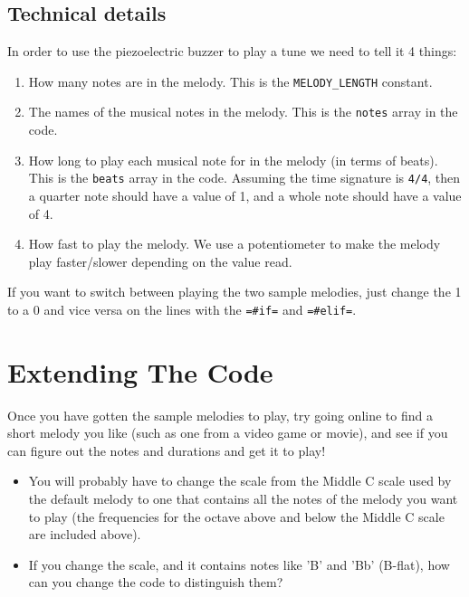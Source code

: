 \documentclass[11pt]{article}
\begin{document}
\subsection{Technical details}
\label{sec-5-1}

In order to use the piezoelectric buzzer to play a tune we need to tell it 4 things:

\begin{enumerate}
\item How many notes are in the melody. This is the \texttt{MELODY\_LENGTH} constant.
\item The names of the musical notes in the melody. This is the \texttt{notes} array in the code.
\item How long to play each musical note for in the melody (in terms of beats). This is the \texttt{beats} array in the
code. Assuming the time signature is \texttt{4/4}, then a quarter note should have a value of 1, and a whole note should
have a value of 4.
\item How fast to play the melody. We use a potentiometer to make the melody play faster/slower depending on the value
read.
\end{enumerate}

If you want to switch between playing the two sample melodies, just change the 1 to a 0 and vice versa on the lines with
the \texttt{=\#if=} and \texttt{=\#elif=}.

\section{Extending The Code}
\label{sec-6}

Once you have gotten the sample melodies to play, try going online to find a short melody you like (such as one from a
video game or movie), and see if you can figure out the notes and durations and get it to play!

\begin{itemize}
\item You will probably have to change the scale from the Middle C scale used by the default melody to one that contains all
the notes of the melody you want to play (the frequencies for the octave above and below the Middle C scale are
included above).

\item If you change the scale, and it contains notes like 'B' and 'Bb' (B-flat), how can you change the code to distinguish
them?
\end{itemize}
\end{document}
